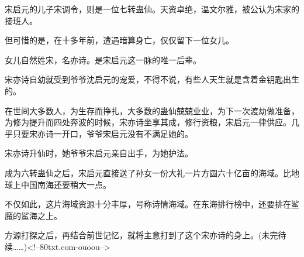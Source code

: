 \begin{this_body}
宋启元的儿子宋调令，则是一位七转蛊仙。天资卓绝，温文尔雅，被公认为宋家的接班人。

但可惜的是，在十多年前，遭遇暗算身亡，仅仅留下一位女儿。

女儿自然姓宋，名亦诗。是宋启元这一脉的唯一后辈。

宋亦诗自幼就受到爷爷沈启元的宠爱，不得不说，有些人天生就是含着金钥匙出生的。

在世间大多数人，为生存而挣扎，大多数的蛊仙兢兢业业，为下一次渡劫做准备，为修为提升而四处奔波的时候，宋亦诗坐享其成，修行资粮，宋启元一律供应。几乎只要宋亦诗一开口，爷爷宋启元没有不满足她的。

宋亦诗升仙时，她爷爷宋启元亲自出手，为她护法。

成为六转蛊仙之后，宋启元直接送了孙女一份大礼一片方圆六十亿亩的海域。比地球上中国南海还要稍大一点。

不仅如此，这片海域资源十分丰厚，号称诗情海域。在东海排行榜中，还要排在鲨魔的鲨海之上。

方源打探之后，再结合前世记忆，就将主意打到了这个宋亦诗的身上。(未完待续……)<!--80txt.com-ouoou-->

\end{this_body}

